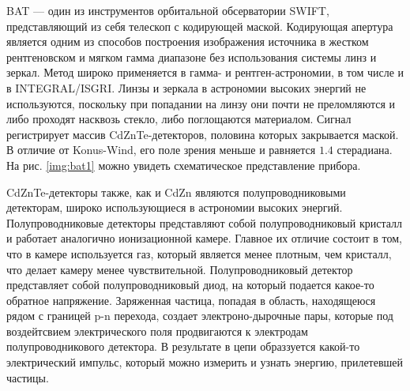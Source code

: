 	BAT --- один из инструментов орбитальной обсерватории SWIFT, представляющий из себя телескоп с кодирующей маской. Кодирующая апертура является одним из способов построения изображения источника в жестком рентгеновском и мягком гамма диапазоне без использования системы линз и зеркал. Метод широко применяется в гамма- и рентген-астрономии, в том числе и в INTEGRAL/ISGRI. Линзы и зеркала в астрономии высоких энергий не используются, поскольку при попадании на линзу они почти не преломляются и либо проходят насквозь стекло, либо поглощаются материалом. Сигнал регистрирует массив CdZnTe-детекторов, половина которых закрывается маской. В отличие от Konus-Wind, его поле зрения меньше и равняется $1.4$ стерадиана. На рис. \ref{img:bat1} можно увидеть схематическое представление прибора.
	 
	 CdZnTe-детекторы также, как и CdZn являются полупроводниковыми детекторам, широко использующиеся в астрономии высоких энергий. Полупроводниковые детекторы представляют собой полупроводниковый кристалл и работает аналогично ионизационной камере. Главное их отличие состоит в том, что в камере используется газ, который является менее плотным, чем кристалл, что делает камеру менее чувствительной. Полупроводниковый детектор представляет собой полупроводниковый диод, на который подается какое-то обратное напряжение. Заряженная частица, попадая в область, находящеюся рядом с границей p-n перехода, создает электроно-дырочные пары, которые под воздейтсвием электрического поля продвигаются к электродам полупроводникового детектора. В результате в цепи образзуется какой-то электрический импульс, который можно измерить и узнать энергию, прилетевшей частицы. 
	
